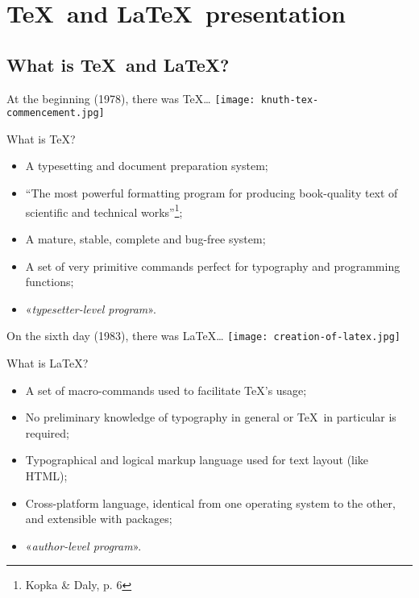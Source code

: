 \small

\section{\TeX\ and \LaTeX\ presentation}

\subsection{What is \TeX\ and \LaTeX?}

\begin{frame}[c,label=fr:commencement]{At the beginning (1978), there was \TeX\ldots}
	\texttt{[image: knuth-tex-commencement.jpg]}
\end{frame}

\begin{frame}[c]{What is \TeX?}

	\begin{itemize}
		\item A typesetting and document preparation system;
		\item ``The most powerful formatting program for producing book-quality text 
			of scientific and technical works''\footnote{Kopka \& Daly, p. 6};
		\item A mature, stable, complete and bug-free system;
		\item A set of very primitive commands perfect for typography and
			programming functions;
		\item «\emph{typesetter-level program}».
	\end{itemize}

\end{frame}

\begin{frame}[c,label=fr:sixiemejour]{On the sixth day (1983), there was \LaTeX\ldots}
	\texttt{[image: creation-of-latex.jpg]}
\end{frame}

\begin{frame}{What is \LaTeX?}
	\begin{itemize}
		\item A set of macro-commands used to facilitate \TeX's usage;
		\item No preliminary knowledge of typography in general or \TeX\ in particular
			is required;
		\item Typographical and logical markup language used for text layout (like HTML);
		\item Cross-platform language, identical from one operating system to the other,
			and extensible with packages;
		\item «\emph{author-level program}».
	\end{itemize}
\end{frame}

